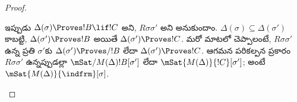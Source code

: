 \documentclass[../../../include/open-logic-section]{subfiles}
\begin{document}
\begin{proof}
\begin{enumerate}
{        ఇప్పుడు $\Delta(\sigma) \Proves !B
        \lif !C$ అని, $R\sigma\sigma'$
        అని అనుకుందాం. $\Delta(\sigma) \subseteq
        \Delta(\sigma')$ కాబట్టి,
        $\Delta(\sigma') \Proves
        !B$ అయితే $\Delta(\sigma') \Proves
        !C$. మరో మాటలో చెప్పాలంటే,
        $R\sigma\sigma'$ ఉన్న ప్రతి
        $\sigma'$కు $\Delta(\sigma') \Proves/
        !B$ లేదా $\Delta(\sigma') \Proves
        !C$. ఆగమన పరికల్పన ప్రకారం
        $R\sigma\sigma'$ ఉన్నప్పుడల్లా
        $\mSat/{M(\Delta)}{!B}[\sigma']$ లేదా
        $\mSat{M(\Delta)}{!C}[\sigma']$;
        అంటే $\mSat{M(\Delta)}{\indfrm}[\sigma]$.}
  \end{enumerate}
\end{proof}
\end{document}
